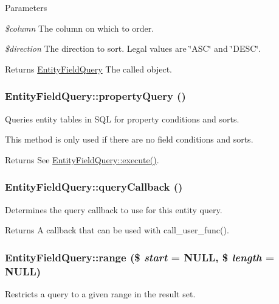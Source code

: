 \begin{DoxyParams}{Parameters}
\item[{\em \$column}]The column on which to order. \item[{\em \$direction}]The direction to sort. Legal values are \char`\"{}ASC\char`\"{} and \char`\"{}DESC\char`\"{}.\end{DoxyParams}
\begin{DoxyReturn}{Returns}
\hyperlink{classEntityFieldQuery}{EntityFieldQuery} The called object. 
\end{DoxyReturn}
\hypertarget{classEntityFieldQuery_ab3bb269b65934d2aaa0fb2fb3bd884e4}{
\subsubsection[{propertyQuery}]{\setlength{\rightskip}{0pt plus 5cm}EntityFieldQuery::propertyQuery ()}}
\label{classEntityFieldQuery_ab3bb269b65934d2aaa0fb2fb3bd884e4}
Queries entity tables in SQL for property conditions and sorts.

This method is only used if there are no field conditions and sorts.

\begin{DoxyReturn}{Returns}
See \hyperlink{classEntityFieldQuery_ac90614418d7fb3a0c81134889fe1bcbd}{EntityFieldQuery::execute()}. 
\end{DoxyReturn}
\hypertarget{classEntityFieldQuery_a79642d38a928c05d6741ec0948e08ddb}{
\subsubsection[{queryCallback}]{\setlength{\rightskip}{0pt plus 5cm}EntityFieldQuery::queryCallback ()}}
\label{classEntityFieldQuery_a79642d38a928c05d6741ec0948e08ddb}
Determines the query callback to use for this entity query.

\begin{DoxyReturn}{Returns}
A callback that can be used with call\_\-user\_\-func(). 
\end{DoxyReturn}
\hypertarget{classEntityFieldQuery_abcea9c7dece049640ef9034f703bd9d7}{
\subsubsection[{range}]{\setlength{\rightskip}{0pt plus 5cm}EntityFieldQuery::range (\$ {\em start} = {\ttfamily NULL}, \/  \$ {\em length} = {\ttfamily NULL})}}
\label{classEntityFieldQuery_abcea9c7dece049640ef9034f703bd9d7}
Restricts a query to a given range in the result set.


